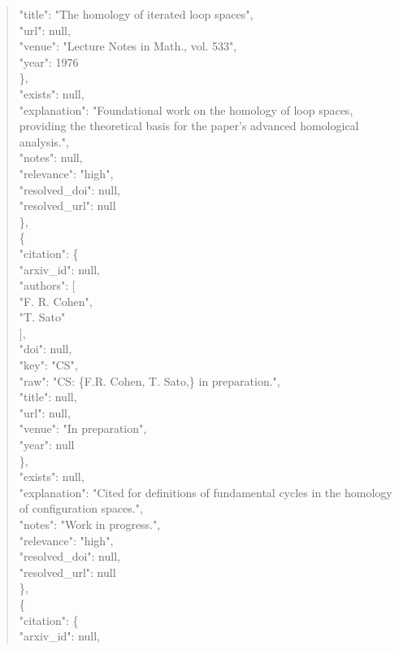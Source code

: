 \documentclass[11pt]{article}
\begin{document}
\begin{quote}
        "title": "The homology of iterated loop spaces",\\
        "url": null,\\
        "venue": "Lecture Notes in Math., vol. 533",\\
        "year": 1976\\
      \},\\
      "exists": null,\\
      "explanation": "Foundational work on the homology of loop spaces, providing the theoretical basis for the paper's advanced homological analysis.",\\
      "notes": null,\\
      "relevance": "high",\\
      "resolved\_doi": null,\\
      "resolved\_url": null\\
    \},\\
    \{\\
      "citation": \{\\
        "arxiv\_id": null,\\
        "authors": [\\
          "F. R. Cohen",\\
          "T. Sato"\\
        ],\\
        "doi": null,\\
        "key": "CS",\\
        "raw": "CS: \{F.R. Cohen, T. Sato,\} in preparation.",\\
        "title": null,\\
        "url": null,\\
        "venue": "In preparation",\\
        "year": null\\
      \},\\
      "exists": null,\\
      "explanation": "Cited for definitions of fundamental cycles in the homology of configuration spaces.",\\
      "notes": "Work in progress.",\\
      "relevance": "high",\\
      "resolved\_doi": null,\\
      "resolved\_url": null\\
    \},\\
    \{\\
      "citation": \{\\
        "arxiv\_id": null,\\

\end{quote}
\end{document}
